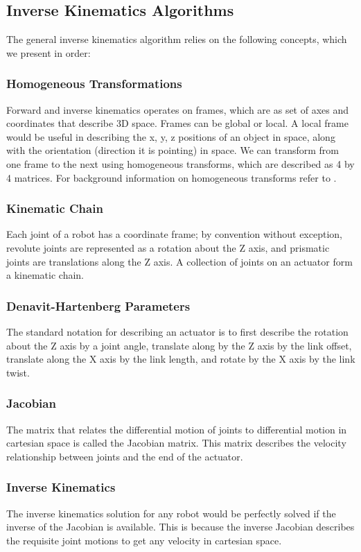 \subsection*{Inverse Kinematics Algorithms}
The general inverse kinematics algorithm relies on the following concepts, which we present in order:

\subsubsection*{Homogeneous Transformations}
Forward and inverse kinematics operates on frames, which are as set of axes and coordinates that describe 3D space. Frames can be global or local. A local frame would be useful in describing the x, y, z positions of an object in space, along with the orientation (direction it is pointing) in space. We can transform from one frame to the next using homogeneous transforms, which are described as 4 by 4 matrices. For background information on homogeneous transforms refer to \cite{frames}.

\subsubsection*{Kinematic Chain}
Each joint of a robot has a coordinate frame; by convention without exception, revolute joints are represented as a rotation about the Z axis, and prismatic joints are translations along the Z axis. A collection of joints on an actuator form a kinematic chain.

\subsubsection*{Denavit-Hartenberg Parameters}
The standard notation for describing an actuator is to first describe the rotation about the Z axis by a joint angle, translate along by the Z axis by the link offset, translate along the X axis by the link length, and rotate by the X axis by the link twist.

\subsubsection*{Jacobian}
The matrix that relates the differential motion of joints to differential motion in cartesian space is called the Jacobian matrix. This matrix describes the velocity relationship between joints and the end of the actuator.\cite{jacobian}

\subsubsection*{Inverse Kinematics}
The inverse kinematics solution for any robot would be perfectly solved if the inverse of the Jacobian is available. This is because the inverse Jacobian describes the requisite joint motions to get any velocity in cartesian space.\cite{jacobian}

